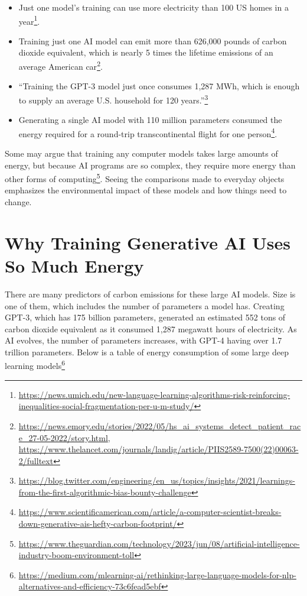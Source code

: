 \documentclass[
]{book}
\begin{document}
\begin{itemize}
\item
  Just one model's training can use more electricity than 100 US homes in a year\footnote{\url{https://news.umich.edu/new-language-learning-algorithms-risk-reinforcing-inequalities-social-fragmentation-per-u-m-study/}}.
\item
  Training just one AI model can emit more than 626,000 pounds of carbon dioxide equivalent, which is nearly 5 times the lifetime emissions of an average American car\footnote{\url{https://news.emory.edu/stories/2022/05/hs_ai_systems_detect_patient_race_27-05-2022/story.html}, \url{https://www.thelancet.com/journals/landig/article/PIIS2589-7500(22)00063-2/fulltext}}.
\item
  ``Training the GPT-3 model just once consumes 1,287 MWh, which is enough to supply an average U.S. household for 120 years.''\footnote{\url{https://blog.twitter.com/engineering/en_us/topics/insights/2021/learnings-from-the-first-algorithmic-bias-bounty-challenge}}
\item
  Generating a single AI model with 110 million parameters consumed the energy required for a round-trip transcontinental flight for one person\footnote{\url{https://www.scientificamerican.com/article/a-computer-scientist-breaks-down-generative-ais-hefty-carbon-footprint/}}.
\end{itemize}

Some may argue that training any computer models takes large amounts of energy, but because AI programs are so complex, they require more energy than other forms of computing\footnote{\url{https://www.theguardian.com/technology/2023/jun/08/artificial-intelligence-industry-boom-environment-toll}}. Seeing the comparisons made to everyday objects emphasizes the environmental impact of these models and how things need to change.

\hypertarget{why-training-generative-ai-uses-so-much-energy}{%
\section{Why Training Generative AI Uses So Much Energy}\label{why-training-generative-ai-uses-so-much-energy}}

There are many predictors of carbon emissions for these large AI models. Size is one of them, which includes the number of parameters a model has. Creating GPT-3, which has 175 billion parameters, generated an estimated 552 tons of carbon dioxide equivalent as it consumed 1,287 megawatt hours of electricity. As AI evolves, the number of parameters increases, with GPT-4 having over 1.7 trillion parameters. Below is a table of energy consumption of some large deep learning models\footnote{\url{https://medium.com/mlearning-ai/rethinking-large-language-models-for-nlp-alternatives-and-efficiency-73c6fead5ebf}}
\end{document}
